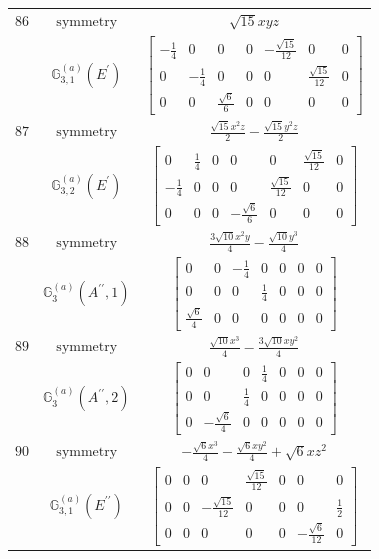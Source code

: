 \documentclass[fleqn,8pt,landscape]{jsarticle}
\begin{document}
\begin{longtable}{ccc}
$ 86 $ & $ \text{symmetry} $ & $ \sqrt{15} x y z $ \\
$  $ & $ \mathbb{G}_{3,1}^{(a)}(E^{\prime}) $ & $ \begin{bmatrix} - \frac{1}{4} & 0 & 0 & 0 & - \frac{\sqrt{15}}{12} & 0 & 0 \\ 0 & - \frac{1}{4} & 0 & 0 & 0 & \frac{\sqrt{15}}{12} & 0 \\ 0 & 0 & \frac{\sqrt{6}}{6} & 0 & 0 & 0 & 0 \end{bmatrix} $ \\ \hline
$ 87 $ & $ \text{symmetry} $ & $ \frac{\sqrt{15} x^{2} z}{2} - \frac{\sqrt{15} y^{2} z}{2} $ \\
$  $ & $ \mathbb{G}_{3,2}^{(a)}(E^{\prime}) $ & $ \begin{bmatrix} 0 & \frac{1}{4} & 0 & 0 & 0 & \frac{\sqrt{15}}{12} & 0 \\ - \frac{1}{4} & 0 & 0 & 0 & \frac{\sqrt{15}}{12} & 0 & 0 \\ 0 & 0 & 0 & - \frac{\sqrt{6}}{6} & 0 & 0 & 0 \end{bmatrix} $ \\ \hline
$ 88 $ & $ \text{symmetry} $ & $ \frac{3 \sqrt{10} x^{2} y}{4} - \frac{\sqrt{10} y^{3}}{4} $ \\
$  $ & $ \mathbb{G}_{3}^{(a)}(A^{\prime\prime},1) $ & $ \begin{bmatrix} 0 & 0 & - \frac{1}{4} & 0 & 0 & 0 & 0 \\ 0 & 0 & 0 & \frac{1}{4} & 0 & 0 & 0 \\ \frac{\sqrt{6}}{4} & 0 & 0 & 0 & 0 & 0 & 0 \end{bmatrix} $ \\ \hline
$ 89 $ & $ \text{symmetry} $ & $ \frac{\sqrt{10} x^{3}}{4} - \frac{3 \sqrt{10} x y^{2}}{4} $ \\
$  $ & $ \mathbb{G}_{3}^{(a)}(A^{\prime\prime},2) $ & $ \begin{bmatrix} 0 & 0 & 0 & \frac{1}{4} & 0 & 0 & 0 \\ 0 & 0 & \frac{1}{4} & 0 & 0 & 0 & 0 \\ 0 & - \frac{\sqrt{6}}{4} & 0 & 0 & 0 & 0 & 0 \end{bmatrix} $ \\ \hline
$ 90 $ & $ \text{symmetry} $ & $ - \frac{\sqrt{6} x^{3}}{4} - \frac{\sqrt{6} x y^{2}}{4} + \sqrt{6} x z^{2} $ \\
$  $ & $ \mathbb{G}_{3,1}^{(a)}(E^{\prime\prime}) $ & $ \begin{bmatrix} 0 & 0 & 0 & \frac{\sqrt{15}}{12} & 0 & 0 & 0 \\ 0 & 0 & - \frac{\sqrt{15}}{12} & 0 & 0 & 0 & \frac{1}{2} \\ 0 & 0 & 0 & 0 & 0 & - \frac{\sqrt{6}}{12} & 0 \end{bmatrix} $ \\ \hline

\end{longtable}
\end{document}
